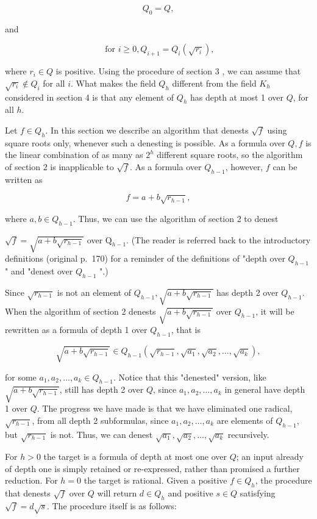 \documentclass[11pt,letterpaper]{article}
\begin{document}
\[
Q_{0}=Q,
\]

and

\[
\text { for } i \geqslant 0, Q_{i+1}=Q_{i}\left(\sqrt{r_{i}}\right),
\]

where $r_{i} \in Q$ is positive. Using the procedure of section 3 , we can assume that $\sqrt{r_{i}} \notin Q_{i}$ for all $i$. What makes the field $Q_{h}$ different from the field $K_{h}$ considered in section 4 is that any element of $Q_{h}$ has depth at most 1 over $Q$, for all $h$.

Let $f \in Q_{h}$. In this section we describe an algorithm that denests $\sqrt{f}$ using square roots only, whenever such a denesting is possible. As a formula over $Q, f$ is the linear combination of as many as $2^{h}$ different square roots, so the algorithm of section 2 is inapplicable to $\sqrt{f}$. As a formula over $Q_{h-1}$, however, $f$ can be written as

\[
f=a+b \sqrt{r_{h-1}},
\]

where $a, b \in Q_{h-1}$. Thus, we can use the algorithm of section 2 to denest

$\sqrt{f}=\sqrt{a+b \sqrt{r_{h-1}}}$ over $\mathrm{Q}_{h-1}$. (The reader is referred back to the introductory definitions (original p.\ 170) for a reminder of the definitions of "depth over $Q_{h-1}$ " and "denest over $Q_{h-1}$ ".)

Since $\sqrt{r_{h-1}}$ is not an element of $Q_{h-1}, \sqrt{a+b \sqrt{r_{h-1}}}$ has depth 2 over $Q_{h-1}$. When the algorithm of section 2 denests $\sqrt{a+b \sqrt{r_{h-1}}}$ over $Q_{h-1}$, it will be rewritten as a formula of depth 1 over $Q_{h-1}$, that is

\[
\sqrt{a+b \sqrt{r_{h-1}}} \in Q_{h-1}\left(\sqrt{r_{h-1}}, \sqrt{a_{1}}, \sqrt{a_{2}}, \ldots, \sqrt{a_{k}}\right),
\]

for some $a_{1}, a_{2}, \ldots, a_{k} \in Q_{h-1}$. Notice that this "denested" version, like $\sqrt{a+b \sqrt{r_{h-1}}}$, still has depth 2 over $Q$, since $a_{1}, a_{2}, \ldots, a_{k}$ in general have depth 1 over $Q$. The progress we have made is that we have eliminated one radical, $\sqrt{r_{h-1}}$, from all depth 2 subformulas, since $a_{1}, a_{2}, \ldots, a_{k}$ are elements of $Q_{h-1}$, but $\sqrt{r_{h-1}}$ is not. Thus, we can denest $\sqrt{a_{1}}, \sqrt{a_{2}}, \ldots, \sqrt{a_{k}}$ recursively.

For $h>0$ the target is a formula of depth at most one over $Q$; an input already of depth one is simply retained or re-expressed, rather than promised a further reduction. For $h=0$ the target is rational. Given a positive $f\in Q_h$, the procedure that denests $\sqrt{f}$ over $Q$ will return $d \in Q_{h}$ and positive $s \in Q$ satisfying $\sqrt{f}=d \sqrt{s}$. The procedure itself is as follows:
\end{document}
